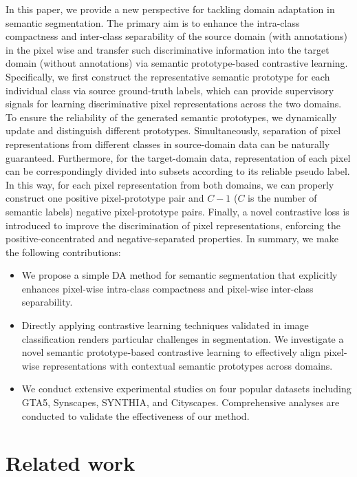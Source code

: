 \documentclass[runningheads]{llncs}
\begin{document}
In this paper, we provide a new perspective for tackling domain adaptation in semantic segmentation. The primary aim is to enhance the intra-class compactness and inter-class separability of the source domain (with annotations) in the pixel wise and transfer such discriminative information into the target domain (without annotations) via semantic prototype-based contrastive learning. Specifically, we first construct the representative semantic prototype for each individual class via source ground-truth labels, which can provide supervisory signals for learning discriminative pixel representations across the two domains. To ensure the reliability of the generated semantic prototypes, we dynamically update and distinguish different prototypes. Simultaneously, separation of pixel representations from different classes in source-domain data can be naturally guaranteed. Furthermore, for the target-domain data, representation of each pixel can be correspondingly divided into subsets according to its reliable pseudo label. In this way, for each pixel representation from both domains, we can properly construct one positive pixel-prototype pair and $C-1$ ($C$ is the number of semantic labels) negative pixel-prototype pairs. Finally, a novel contrastive loss is introduced to improve the discrimination of pixel representations, enforcing the positive-concentrated and negative-separated properties. 
In summary, we make the following contributions:\begin{itemize}
    \item We propose a simple DA method for semantic segmentation that explicitly enhances pixel-wise intra-class compactness and pixel-wise inter-class separability.
    \item Directly applying contrastive learning techniques validated in image classification renders particular challenges in segmentation. We investigate a novel semantic prototype-based contrastive learning to effectively align pixel-wise representations with contextual semantic prototypes across domains.
    \item We conduct extensive experimental studies on four popular datasets including GTA5, Synscapes, SYNTHIA, and Cityscapes. Comprehensive analyses are conducted to validate the effectiveness of our method.
\end{itemize}



\section{Related work}
\end{document}
